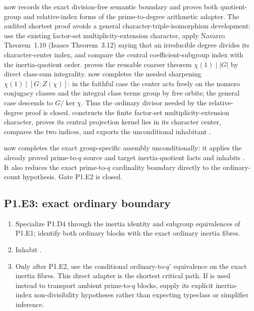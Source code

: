 \documentclass[11pt]{article}
\begin{document}
 now records the exact
division-free semantic boundary
 and proves both quotient-group and
relative-index forms of the prime-to-degree arithmetic adapter.  The
audited shortest proof avoids a general character-triple-isomorphism
development: use the existing factor-set multiplicity-extension character,
apply
Navarro Theorem~1.10 (Isaacs Theorem~3.12) saying that an irreducible
degree divides its character-center index, and compare the central
coefficient-subgroup index with the inertia-quotient order.
 proves the reusable
coarser theorem \(\chi(1)\mid |G|\) by direct class-sum integrality.
 now completes the
needed sharpening
\(\chi(1)\mid [G:Z(\chi)]\): in the faithful case the center acts freely
on the nonzero conjugacy classes and the integral class terms group by
free orbits; the general case descends to \(G/\ker\chi\).  Thus the
ordinary divisor needed by the relative-degree proof is closed.
 constructs the
finite factor-set multiplicity-extension character, proves its central
projection kernel lies in its character center, compares the two indices,
and exports the unconditional inhabitant
.

now completes the exact group-specific assembly unconditionally: it
applies the already proved
prime-to-\(q\) source and target inertia-quotient facts and inhabits
.
It also reduces the exact prime-to-\(q\) cardinality boundary directly to
the ordinary-count hypothesis.  Gate P1.E2 is closed.

\subsection{P1.E3: exact ordinary boundary}

\begin{enumerate}[label=\textbf{P1.E3.\arabic*.},leftmargin=*]
  \item Specialize P1.D4 through the inertia identity and subgroup
  equivalences of P1.E1; identify both ordinary blocks with the exact
  ordinary inertia fibres.
  \item Inhabit
  .
  \item Only after P1.E2, use the conditional ordinary-to-\(q'\)
  equivalence on the exact inertia fibres.  This direct adapter is the
  shortest critical path.  If
   is used instead
  to transport ambient prime-to-\(q\) blocks, supply its explicit
  inertia-index non-divisibility hypotheses rather than expecting
  typeclass or simplifier inference.
\end{enumerate}
\end{document}
